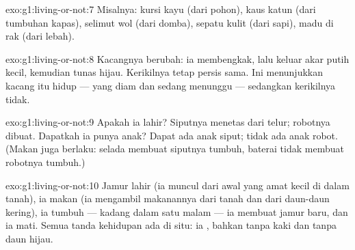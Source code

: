 \begin{solution}{exo:g1:living-or-not:7}
Misalnya: kursi kayu (dari pohon), kaus katun (dari tumbuhan kapas),
selimut wol (dari domba), sepatu kulit (dari sapi), madu di rak (dari
lebah).
\end{solution}

\begin{solution}{exo:g1:living-or-not:8}
Kacangnya berubah: ia membengkak, lalu keluar akar putih kecil,
kemudian tunas hijau. Kerikilnya tetap persis sama. Ini menunjukkan
kacang itu hidup ---  yang diam dan sedang menunggu ---
sedangkan kerikilnya tidak.
\end{solution}

\begin{solution}{exo:g1:living-or-not:9}
Apakah ia lahir? Siputnya menetas dari telur; robotnya dibuat.
Dapatkah ia punya anak? Dapat ada anak siput; tidak ada anak robot.
(Makan juga berlaku: selada membuat siputnya tumbuh, baterai tidak
membuat robotnya tumbuh.)
\end{solution}

\begin{solution}{exo:g1:living-or-not:10}
Jamur lahir (ia muncul dari awal yang amat kecil di dalam tanah), ia
makan (ia mengambil makanannya dari tanah dan dari daun-daun kering),
ia tumbuh --- kadang dalam satu malam --- ia membuat jamur baru, dan
ia mati. Semua tanda kehidupan ada di situ: ia , bahkan
tanpa kaki dan tanpa daun hijau.
\end{solution}
